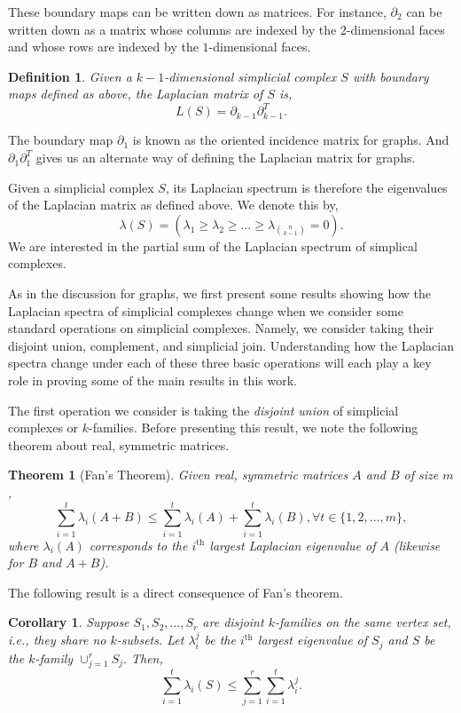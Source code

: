 \documentclass[11pt]{article}
\newtheorem{thm}[lm]{Theorem}
\newtheorem{defi}[lm]{Definition}
\newtheorem{cor}[lm]{Corollary}
\begin{document}
These boundary maps can be written down as matrices. For instance, $\partial_2$ can be written down as a matrix whose columns are indexed by the $2$-dimensional faces and whose rows are indexed by the $1$-dimensional faces.

\begin{defi}
Given a $k-1$-dimensional simplicial complex $S$ with boundary maps defined as above, the \emph{Laplacian matrix} of $S$ is,
$$L(S) = \partial_{k - 1} \partial_{k - 1}^T.$$
\end{defi}

The boundary map $\partial_1$ is known as the oriented incidence matrix for graphs. And $\partial_1 \partial_1^T$ gives us an alternate way of defining the Laplacian matrix for graphs.

Given a simplicial complex $S$, its Laplacian spectrum is therefore the eigenvalues of the Laplacian matrix as defined above. We denote this by,
$$\lambda(S) = \left( \lambda_1 \geq \lambda_2 \geq \ldots \geq \lambda_{\binom{n}{k-1 }} = 0\right).$$
We are interested in the partial sum of the Laplacian spectrum of simplical complexes.

As in the discussion for graphs, we first present some results showing how the Laplacian spectra of simplicial complexes change when we consider some standard operations on simplicial complexes. Namely, we consider taking their disjoint union, complement, and simplicial join. Understanding how the Laplacian spectra change under each of these three basic operations will each play a key role in proving some of the main results in this work.

The first operation we consider is taking the \emph{disjoint union} of simplicial complexes or $k$-families. Before presenting this result, we note the following theorem about real, symmetric matrices.


\begin{thm}[Fan's Theorem]
Given real, symmetric matrices $A$ and $B$ of size $m$,
$$\sum_{i = 1}^t \lambda_i(A + B) \leq \sum_{i = 1}^t \lambda_i(A) +\sum_{i = 1}^t \lambda_i(B), \forall t \in \{1, 2, \ldots, m\},$$
where $\lambda_i (A)$ corresponds to the $i^{\text{th}}$ largest Laplacian eigenvalue of $A$ (likewise for $B$ and $A+ B$).
\end{thm}

The following result is a direct consequence of Fan's theorem.

\begin{cor}\label{cor:fan}
Suppose $S_1, S_2, \ldots, S_r$ are disjoint $k$-families on the same vertex set, i.e., they share no $k$-subsets. Let $\lambda_i^j$ be the $i^{\text{th}}$ largest eigenvalue of $S_j$ and $S$ be the $k$-family $\cup_{j = 1}^r S_j.$ Then,
$$\sum_{i =1}^t \lambda_i(S) \leq \sum_{j = 1}^r \sum_{i = 1}^t \lambda_i^j.$$
\end{cor}
\end{document}
